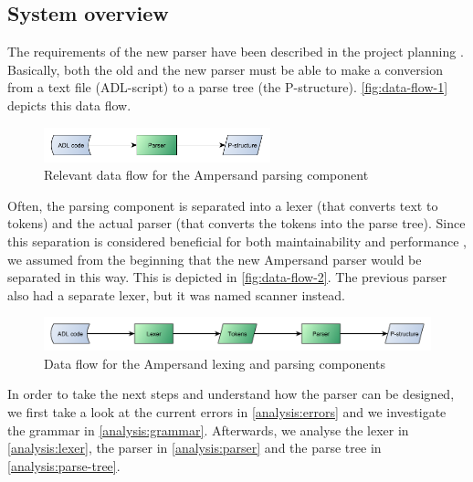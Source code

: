 
\subsection{System overview}
The requirements of the new parser have been described in the project planning .
Basically, both the old and the new parser must be able to make a conversion from a text file (ADL-script) to a parse tree (the P-structure).
\autoref{fig:data-flow-1} depicts this data flow.
%
\begin{figure}[htb!]
	\centering
	\includegraphics[width=0.586\textwidth]{Figures/DataFlow1}
	\caption{Relevant data flow for the Ampersand parsing component}
	\label{fig:data-flow-1}
\end{figure}

Often, the parsing component is separated into a lexer (that converts text to tokens) and the actual parser (that converts the tokens into the parse tree).
Since this separation is considered beneficial for both maintainability and performance , we assumed from the beginning that the new Ampersand parser would be separated in this way.
This is depicted in \autoref{fig:data-flow-2}.
The previous parser also had a separate lexer, but it was named scanner instead.
%
\begin{figure}[htb!]
	\centering
	\includegraphics[width=1\textwidth]{Figures/DataFlow2}
	\caption{Data flow for the Ampersand lexing and parsing components}
	\label{fig:data-flow-2}
\end{figure}

In order to take the next steps and understand how the parser can be designed, we first take a look at the current errors in \autoref{analysis:errors} and we investigate the grammar in \autoref{analysis:grammar}.
Afterwards, we analyse the lexer in \autoref{analysis:lexer}, the parser in \autoref{analysis:parser} and the parse tree in \autoref{analysis:parse-tree}.
